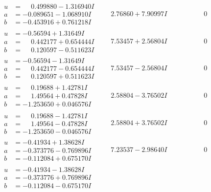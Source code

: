 \documentclass[1p]{elsarticle_modified}
\theoremstyle{definition}
\begin{document}
$$\begin{array}{c|c|c}
\begin{aligned}
u &= \phantom{-}0.499880 - 1.316940 I \\
a &= -0.089651 - 1.068910 I \\
b &= -0.453916 + 0.761218 I\end{aligned}
 & \phantom{-}2.76860 + 7.90997 I & \phantom{-0.000000 } 0 \\ \hline\begin{aligned}
u &= -0.56594 + 1.31649 I \\
a &= \phantom{-}0.442177 + 0.654444 I \\
b &= \phantom{-}0.120597 - 0.511623 I\end{aligned}
 & \phantom{-}7.53457 + 2.56804 I & \phantom{-0.000000 } 0 \\ \hline\begin{aligned}
u &= -0.56594 - 1.31649 I \\
a &= \phantom{-}0.442177 - 0.654444 I \\
b &= \phantom{-}0.120597 + 0.511623 I\end{aligned}
 & \phantom{-}7.53457 - 2.56804 I & \phantom{-0.000000 } 0 \\ \hline\begin{aligned}
u &= \phantom{-}0.19688 + 1.42781 I \\
a &= \phantom{-}1.49564 + 0.47828 I \\
b &= -1.253650 + 0.046576 I\end{aligned}
 & \phantom{-}2.58804 - 3.76502 I & \phantom{-0.000000 } 0 \\ \hline\begin{aligned}
u &= \phantom{-}0.19688 - 1.42781 I \\
a &= \phantom{-}1.49564 - 0.47828 I \\
b &= -1.253650 - 0.046576 I\end{aligned}
 & \phantom{-}2.58804 + 3.76502 I & \phantom{-0.000000 } 0 \\ \hline\begin{aligned}
u &= -0.41934 + 1.38628 I \\
a &= -0.373776 - 0.769896 I \\
b &= -0.112084 + 0.675170 I\end{aligned}
 & \phantom{-}7.23537 - 2.98640 I & \phantom{-0.000000 } 0 \\ \hline\begin{aligned}
u &= -0.41934 - 1.38628 I \\
a &= -0.373776 + 0.769896 I \\
b &= -0.112084 - 0.675170 I\end{aligned}

\end{array}$$
\end{document}
